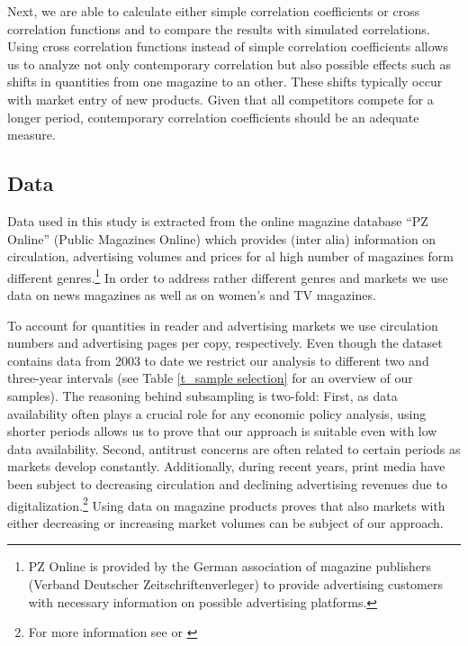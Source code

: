 \documentclass[12pt,a4paper,notitlepage]{article}
\begin{document}
Next, we are able to calculate either simple correlation coefficients or cross correlation functions and to compare the results with simulated correlations. Using cross correlation functions instead of simple correlation coefficients allows us to analyze not only contemporary correlation but also possible effects such as shifts in quantities from one magazine to an other. These shifts typically occur with market entry of new products. Given that all competitors compete for a longer period, contemporary correlation coefficients should be an adequate measure. 



\subsection{Data}\label{sec:data}

Data used in this study is extracted from the online magazine database ``PZ Online'' (Public Magazines Online) which provides (inter alia) information on circulation, advertising volumes and prices for al high number of magazines form different genres.\footnote{PZ Online is provided by the German association of magazine publishers (Verband Deutscher Zeitschriftenverleger) to provide advertising customers with necessary information on possible advertising platforms.} In order to address rather different genres and markets we use data on news magazines as well as on women's and TV magazines. 

To account for quantities in reader and advertising markets we use circulation numbers and advertising pages per copy, respectively. 
Even though the dataset contains data from 2003 to date we restrict our analysis to different two and three-year intervals (see Table \ref{t_sample selection} for an overview of our samples). The reasoning behind subsampling is two-fold: First, as data availability often plays a crucial role for any economic policy analysis, using shorter periods allows us to prove that our approach is suitable even with low data availability. 
Second, antitrust concerns are often related to certain periods as markets develop constantly. Additionally, during recent years, print media have been subject to decreasing circulation and declining advertising revenues due to digitalization.\footnote{For more information see \cite{cabyova_impact_2014} or \cite{picard_digitization_2011}} Using data on magazine products proves that also markets with either decreasing or increasing market volumes can be subject of our approach.
\end{document}
